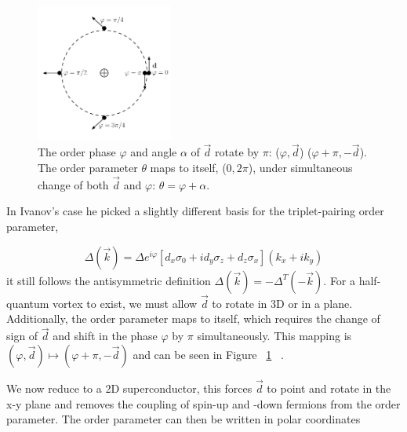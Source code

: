 \begin{figure}
  \includegraphics[width=0.4\textwidth]{./figures/half-quantum-vortex.pdf}
  \caption{The order phase $\varphi$ and angle $\alpha$ of $\vec{d}$ rotate by $\pi$: ($\varphi , \vec{d}$) \rightarrow ($\varphi+\pi, -\vec{d}$). The order parameter $\theta$ maps to itself, ($0, 2\pi$), under simultaneous change of both $\vec{d}$ and $\varphi$: $\theta = \varphi + \alpha$.}
  \label{fig:half-quantum-vortex}
\end{figure}

In Ivanov's case he picked a slightly different basis for the triplet-pairing order parameter,

\begin{equation}
  \Delta (\vec{k}) = \Delta e^{i\varphi} \left[ d_x \sigma_0 + i d_y \sigma_z + d_z \sigma_x \right] (k_x + i k_y)
\end{equation}
it still follows the antisymmetric definition
$\Delta(\vec{k}) = -\Delta^T (-\vec{k})$.
For a half-quantum vortex to exist, we must allow $\vec{d}$ to rotate in 3D or in a plane.
Additionally, the order parameter maps to itself, which requires the change of sign of $\vec{d}$ and shift in the phase $\varphi$ by $\pi$ simultaneously.
This mapping is
$(\varphi, \vec{d}) \mapsto (\varphi+\pi,-\vec{d})$
and can be seen in Figure ~\ref{fig:half-quantum-vortex} ~\cite{ivanovNonAbelianStatisticsHalfQuantum2001}.

We now reduce to a 2D superconductor, this forces $\vec{d}$ to point and rotate in the x-y plane and removes the coupling of spin-up and -down fermions from the order parameter.
The order parameter can then be written in polar coordinates

